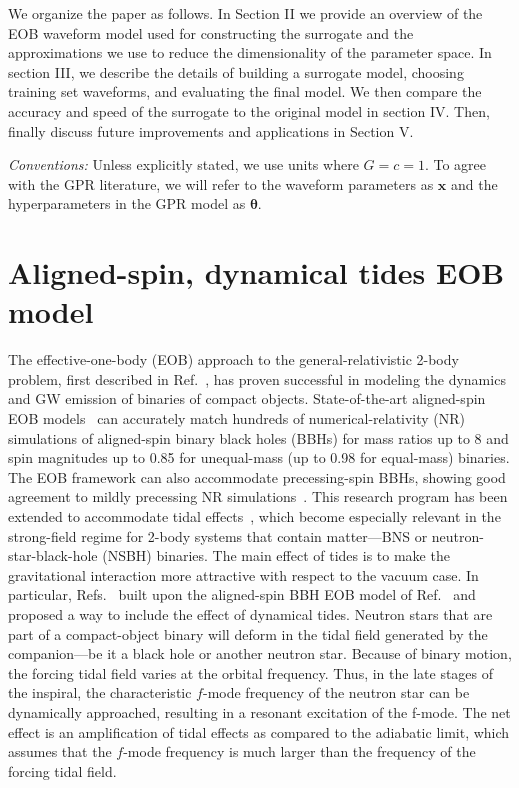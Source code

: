\documentclass[prd,aps,letter,twocolumn,floatfix,notitlepage,nofootinbib]{revtex4-1}
\def\bx{\mathbf{x}}
\def\btheta{\boldsymbol{\theta}}
\begin{document}
We organize the paper as follows. In Section II we provide an overview of the EOB waveform model used for constructing the surrogate and the approximations we use to reduce the dimensionality of the parameter space. In section III, we describe the details of building a surrogate model, choosing training set waveforms, and evaluating the final model. We then compare the accuracy and speed of the surrogate to the original model in section IV. Then, finally discuss future improvements and applications in Section V.

\textit{Conventions:} Unless explicitly stated, we use units where $G=c=1$. To agree with the GPR literature, we will refer to the waveform parameters as $\bx$ and the hyperparameters in the GPR model as $\btheta$.


\section{Aligned-spin, dynamical tides EOB model}
\label{sec:eob}

The effective-one-body (EOB) approach to the general-relativistic 2-body problem, first described in Ref.~\cite{Buonanno:1998gg}, has proven successful in modeling the dynamics and GW emission of binaries of compact objects. State-of-the-art aligned-spin EOB models~\cite{Bohe:2016gbl,Nagar:2017jdw} can accurately match hundreds of numerical-relativity (NR) simulations of aligned-spin binary black holes (BBHs) for mass ratios up to 8 and spin magnitudes up to 0.85 for unequal-mass (up to 0.98 for equal-mass) binaries. The EOB framework can also accommodate precessing-spin BBHs, showing good agreement to mildly precessing NR simulations~\cite{Babak:2016tgq}. This research program has been extended to accommodate tidal effects~\cite{Damour:2009wj,Vines:2010ca,Damour:2012yf,Bini:2012gu,Bernuzzi:2014owa,Hinderer:2016eia,Steinhoff:2016rfi,Dietrich:2017feu}, which become especially relevant in the strong-field regime for 2-body systems that contain matter---BNS or neutron-star-black-hole (NSBH) binaries. The main effect of tides is to make the gravitational interaction more attractive with respect to the vacuum case. In particular, Refs.~\cite{Hinderer:2016eia,Steinhoff:2016rfi} built upon the aligned-spin BBH EOB model of Ref.~\cite{Taracchini:2013rva} and proposed a way to include the effect of dynamical tides. Neutron stars that are part of a compact-object binary will deform in the tidal field generated by the companion---be it a black hole or another neutron star. Because of binary motion, the forcing tidal field varies at the orbital frequency. Thus, in the late stages of the inspiral, the characteristic $f$-mode frequency of the neutron star can be dynamically approached, resulting in a resonant excitation of the f-mode. The net effect is an amplification of tidal effects as compared to the adiabatic limit, which assumes that the $f$-mode frequency is much larger than the frequency of the forcing tidal field. 
\end{document}
